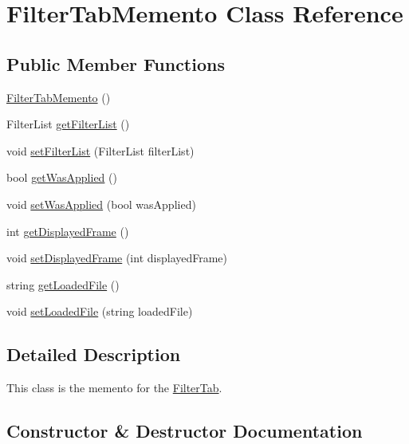\hypertarget{classFilterTabMemento}{}\section{Filter\+Tab\+Memento Class Reference}
\label{classFilterTabMemento}
\subsection*{Public Member Functions}
\begin{DoxyCompactItemize}
\item 
\hyperlink{classFilterTabMemento_a84a5fcbb2f69b5b3c57dae3540fdd40b}{Filter\+Tab\+Memento} ()
\item 
Filter\+List \hyperlink{classFilterTabMemento_a280f248ca0ce6f6089c039f1c60a0341}{get\+Filter\+List} ()
\item 
void \hyperlink{classFilterTabMemento_aaff6031b8ea0e2ab637699e8764f5a30}{set\+Filter\+List} (Filter\+List filter\+List)
\item 
bool \hyperlink{classFilterTabMemento_aece4e0d122e3afae0c4173edba6a4cc8}{get\+Was\+Applied} ()
\item 
void \hyperlink{classFilterTabMemento_a635ac39ad3547885c6d8a5f631a86aeb}{set\+Was\+Applied} (bool was\+Applied)
\item 
int \hyperlink{classFilterTabMemento_a116429d102ca02253915c78f76d305d2}{get\+Displayed\+Frame} ()
\item 
void \hyperlink{classFilterTabMemento_ad3eeeb568c249bd940edc513b0697cd8}{set\+Displayed\+Frame} (int displayed\+Frame)
\item 
string \hyperlink{classFilterTabMemento_aef6a8daef5ed9e5ac0862ef4323f3f8d}{get\+Loaded\+File} ()
\item 
void \hyperlink{classFilterTabMemento_a2dc9fb31a997a0f4d76aa4b6d11c12c9}{set\+Loaded\+File} (string loaded\+File)
\end{DoxyCompactItemize}


\subsection{Detailed Description}
This class is the memento for the \hyperlink{classFilterTab}{Filter\+Tab}. 

\subsection{Constructor \& Destructor Documentation}
\hypertarget{classFilterTabMemento_a84a5fcbb2f69b5b3c57dae3540fdd40b}{}
